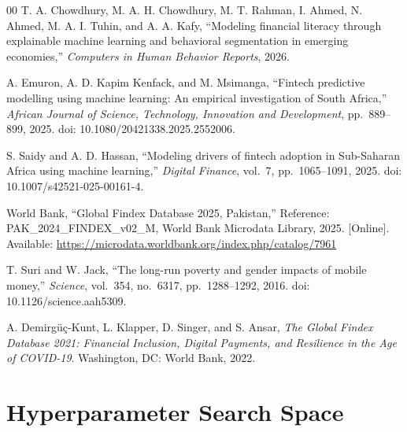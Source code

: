 \documentclass[conference]{IEEEtran}
\begin{document}
\begin{thebibliography}{00}
 T. A. Chowdhury, M. A. H. Chowdhury, M. T. Rahman, I. Ahmed, N. Ahmed, M. A. I. Tuhin, and A. A. Kafy, ``Modeling financial literacy through explainable machine learning and behavioral segmentation in emerging economies,'' \emph{Computers in Human Behavior Reports}, 2026.
 
 A. Emuron, A. D. Kapim Kenfack, and M. Msimanga, ``Fintech predictive modelling using machine learning: An empirical investigation of South Africa,'' \emph{African Journal of Science, Technology, Innovation and Development}, pp.\ 889--899, 2025. doi: 10.1080/20421338.2025.2552006.
 
 S. Saidy and A. D. Hassan, ``Modeling drivers of fintech adoption in Sub-Saharan Africa using machine learning,'' \emph{Digital Finance}, vol.\ 7, pp.\ 1065--1091, 2025. doi: 10.1007/s42521-025-00161-4.
 
 World Bank, ``Global Findex Database 2025, Pakistan,'' Reference: PAK\_2024\_FINDEX\_v02\_M, World Bank Microdata Library, 2025. [Online]. Available: \url{https://microdata.worldbank.org/index.php/catalog/7961}
 
 T. Suri and W. Jack, ``The long-run poverty and gender impacts of mobile money,'' \emph{Science}, vol.\ 354, no.\ 6317, pp.\ 1288--1292, 2016. doi: 10.1126/science.aah5309.
 
 A. Demirg\"u\c{c}-Kunt, L. Klapper, D. Singer, and S. Ansar, \emph{The Global Findex Database 2021: Financial Inclusion, Digital Payments, and Resilience in the Age of COVID-19}. Washington, DC: World Bank, 2022.
 
\end{thebibliography}
 
\appendices
 
\section{Hyperparameter Search Space}
\label{sec:appendix_hyperparameter_search_space}
\end{document}
